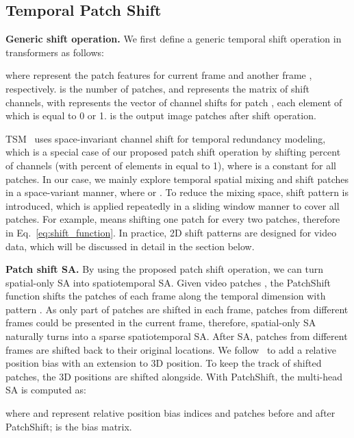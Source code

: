 \documentclass[runningheads]{llncs}
\begin{document}
	\subsection{Temporal Patch Shift} 
	
	\noindent \textbf{Generic shift operation.} We first define a generic temporal shift operation in transformers as follows:
	
	
	\noindent 
	where  represent the patch features for current frame  and another frame , respectively.  is the number of patches, and  represents the matrix of shift channels, with  represents the vector of channel shifts for patch , each element of which is equal to 0 or 1.  is the output image patches after shift operation.
	
	TSM~\cite{lin2019tsm} uses space-invariant channel shift for temporal redundancy modeling, which is a special case of our proposed patch shift operation by shifting  percent of channels (with  percent of elements in  equal to 1), where  is a constant for all patches. In our case, we mainly explore temporal spatial mixing and shift patches in a space-variant manner, where  or . To reduce the mixing space, shift pattern  is introduced, which is applied repeatedly in a sliding window manner to cover all patches. For example,  means shifting one patch for every two patches, therefore  in Eq.~\ref{eq:shift_function}. In practice, 2D shift patterns are designed for video data, which will be discussed in detail in the section below.
	
	
	
	\textbf{Patch shift SA.} By using the proposed patch shift operation, we can turn spatial-only SA into spatiotemporal SA. Given video patches , the PatchShift function shifts the patches of each frame along the temporal dimension with pattern . As only part of patches are shifted in each frame, patches from different frames could be presented in the current frame, therefore, spatial-only SA naturally turns into a sparse spatiotemporal SA. After SA, patches from different frames are shifted back to their original locations. We follow~\cite{liu2021swin} to add a relative position bias with an extension to 3D position. To keep the track of shifted patches, the 3D positions are shifted alongside. With PatchShift, the multi-head SA is computed as: 
	
	
	
	
	\noindent where  and  represent relative position bias indices and patches before and after PatchShift;  is the bias matrix.
	
\end{document}
